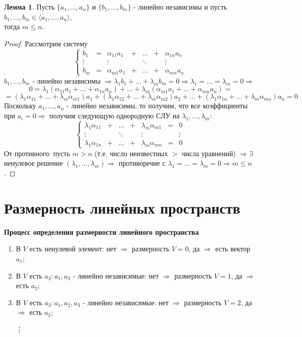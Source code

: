\documentclass[12pt]{article}
\theoremstyle{definition}
\newtheorem{lemma}{Лемма}
\begin{document}
\begin{lemma}
	Пусть $\{a_1,\dotsc,a_n\}$ и $\{b_1, \dotsc, b_m\}$ - линейно независимы и пусть $b_1, \dotsc, b_m \in \langle a_1, \dotsc, a_n \rangle$,\\ тогда $m \leq n$.
\end{lemma}
\begin{proof}
	Рассмотрим систему 
	$$
	\left\{\begin{array}{ccccccc} b_1 &=& \alpha_{11} a_1& + &\dotsc& + & \alpha_{1n}a_n \\ \vdots & & \vdots & &\ddots & &\vdots \\ b_m &=& \alpha_{m1} a_1 & + & \dotsc & + & \alpha_{mn} a_n\end{array}\right.\,
	$$ 
	$b_1, \dotsc, b_m$ - линейно независимы $\Rightarrow \lambda_1 b_1 + \dotsc + \lambda_m b_m = 0 \Rightarrow \lambda_1 = \dotsc = \lambda_m = 0 \Rightarrow$ 
	$$0 = \lambda_1 (\alpha_{11} a_1 + \dotsc + \alpha_{1n} a_n) + \dotsc + \lambda_m (\alpha_{m1} a_1 + \dotsc + \alpha_{mn}a_n) =$$ 
	$$ = (\lambda_1 \alpha_{11} + \dotsc + \lambda_m \alpha_{m1})a_1 + (\lambda_1 \alpha_{12} + \dotsc + \lambda_m \alpha_{m2})a_2 + \dotsc + (\lambda_1 \alpha_{1n} + \dotsc + \lambda_m \alpha_{mn})a_n = 0$$
	Поскольку $a_1, \dotsc , a_n$ - линейно независимы, то получим, что все коэффициенты при $a_i = 0 \Rightarrow$ получим следующую однородную СЛУ на $\lambda_1,\dotsc, \lambda_m$:
	$$
	\left\{\begin{array}{ccccccc}  \lambda_1 \alpha_{11} & + &\dotsc& + & \lambda_m \alpha_{m1} &=& 0 \\ \vdots & & \ddots & &\vdots & &\vdots \\  \lambda_1 \alpha_{1n} & + & \dotsc & + & \lambda_m \alpha_{mn} &=& 0\end{array}\right.\,
	$$ 	
	От противного: пусть $m > n$ (т.е. число неизвестных $>$ числа уравнений) $\Rightarrow \exists$ ненулевое решение $(\lambda_1, \dotsc, \lambda_m) \Rightarrow$ противоречие с $\lambda_1 = \dotsc = \lambda_m = 0 \Rightarrow m \leq n$.
\end{proof}

\section*{Размерность линейных пространств}

\textbf{Процесс определения размерности линейного пространства}
\begin{enumerate}[label ={(\arabic*)}]
	\item В $V$ есть ненулевой элемент: нет $\Rightarrow$ размерность $V = 0$, да $\Rightarrow$ есть вектор $a_1$;
	\item В $V$ есть $a_2 \colon a_1, a_2$ - линейно независимые: нет $\Rightarrow$ размерность $V = 1$, да $\Rightarrow$ есть $a_2$;
	\item В $V$ есть $a_3 \colon a_1, a_2, a_3$ - линейно независимые: нет $\Rightarrow$ размерность $V = 2$, да $\Rightarrow$ есть $a_3$;
	\item[\vdots] 
\end{enumerate}
\end{document}
